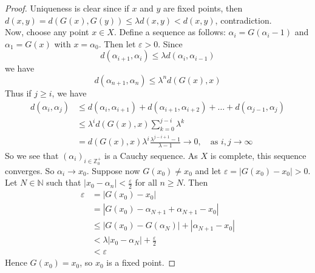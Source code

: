 \documentclass[reqno]{amsart}
\theoremstyle{plain}%
\theoremstyle{definition}
\theoremstyle{remark}
\begin{document}
        \begin{proof}
        Uniqueness is clear since if $x$ and $y$ are fixed points, then
        $d\left( x,y \right) = d\left( G(x), G(y) \right) \le 
        \lambda d(x,y) < d(x,y)$, contradiction.\\
        Now, choose any point $x \in X$. Define a sequence as follows:
        $\alpha_i = G \left( \alpha_i-1 \right)$ and
        $\alpha_1 = G(x)$ with $x = \alpha_0$. Then let $\varepsilon >0$. 
        Since
        \[
        d\left( \alpha_{i+1}, \alpha_i \right) 
        \le \lambda d\left( \alpha_i, \alpha_{i-1} \right) 
        \] 
        we have
        \[
        d\left( \alpha_{n+1}, \alpha_n \right) \le 
        \lambda^{n} d\left( G(x),x \right) 
        \] 
        Thus if $j \ge i$, we have
        \begin{align*}
            d \left( \alpha_i, \alpha_j \right) 
            &\le d \left( \alpha_i, \alpha_{i+1} \right) 
            + d \left( \alpha_{i+1}, \alpha_{i+2} \right) + \ldots +
            d\left( \alpha_{j-1}, \alpha_j \right)\\
            &\le \lambda^{i} d\left( G(x),x \right) \sum_{k=0}^{j-i} \lambda^{k}\\
            &= d \left( G(x),x \right) \lambda^{i} \frac{\lambda^{j-i+1}
            - 1}{\lambda - 1} \to 0, \quad \text{as } i,j \to \infty
        \end{align*}
        So we see that $\left( \alpha_i \right)_{i
        \in \mathbb{Z}_0^{+}}$ is a Cauchy sequence. As $X$ is complete, this
        sequence converges. So $\alpha_i \to x_0$. Suppose now
        $G(x_0) \neq x_0$ and let $\varepsilon = \left| G(x_0)-x_0 \right| >0 $.
        Let $N \in \mathbb{N}$ such that
        $\left| x_0 - \alpha_n \right| < \frac{\varepsilon}{2}$ for all
        $n \ge N$. Then
        \begin{align*}
            \varepsilon 
            &= \left| G(x_0) - x_0 \right| \\
            &= \left| G(x_0) - \alpha_{N+1} + \alpha_{N+1} -x_0 \right| \\
            &\le \left| G(x_0) - G\left( \alpha_N \right)  \right| 
            + \left| \alpha_{N+1}-x_0 \right| \\
            &< \lambda \left| x_0 - \alpha_N \right| + \frac{\varepsilon}{2}\\
            &< \varepsilon
        \end{align*}
        Hence $G(x_0) = x_0$, so $x_0$ is a fixed point.
        \end{proof}
\end{document}
